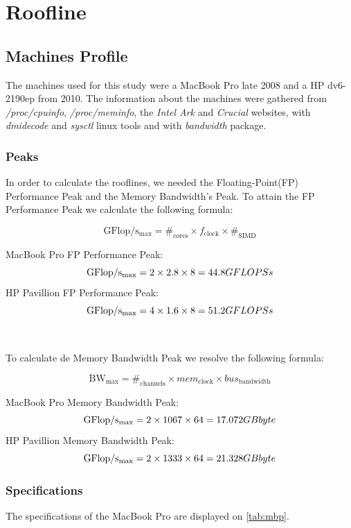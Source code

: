\documentclass[a4paper,10pt,openright,openbib]{article}
\begin{document}
\section{Roofline}
\subsection{Machines Profile}
The machines used for this study were a MacBook Pro late 2008 and a HP dv6-2190ep from 2010.
The information about the machines were gathered from \emph{/proc/cpuinfo}, \emph{/proc/meminfo}, the \emph{Intel Ark} and \emph{Crucial} websites, with \emph{dmidecode} and \emph{sysctl} linux tools and with \emph{bandwidth} package.

\subsubsection{Peaks}
In order to calculate the rooflines, we needed the Floating-Point(FP) Performance Peak and the Memory Bandwidth's Peak. 
To attain the FP Performance Peak we calculate the following formula:

$$\mathrm{GFlop/s_{max}} =  \#_{\mathrm{cores}} \times f_{\mathrm{clock}} \times \#_{\mathrm{SIMD}}$$

MacBook Pro FP Performance Peak:
$$\mathrm{GFlop/s_{max}} =  2 \times 2.8 \times 8
						 =  44.8 GFLOPS\\s$$
HP Pavillion FP Performance Peak:
$$\mathrm{GFlop/s_{max}} =  4 \times 1.6 \times 8
						 =  51.2 GFLOPS\\s$$
\\
\\
To calculate de Memory Bandwidth Peak we resolve the following formula:

$$\mathrm{BW_{max}} =  \#_{\mathrm{channels}} \times mem_{\mathrm{clock}} \times bus_{\mathrm{bandwidth}}$$
 
MacBook Pro Memory Bandwidth Peak:
$$\mathrm{GFlop/s_{max}} =  2 \times 1067 \times 64
						 =  17.072 GB\\byte$$
HP Pavillion Memory Bandwidth Peak:
$$\mathrm{GFlop/s_{max}} =  2 \times 1333 \times 64
						 =  21.328 GB\\byte$$

\subsubsection{Specifications}
The specifications of the MacBook Pro are displayed on \autoref{tab:mbp}. \\
\end{document}
